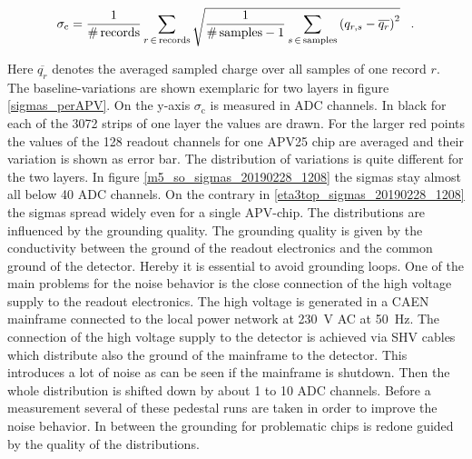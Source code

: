 \documentclass[
twoside,            %
BCOR1.4cm,          %
10pt,               %
headings=normal,    %
headsepline,        %
clearplainpage,		%
final,              %
div=14,
open=right,
bibliography=toc
]{scrreprt}
\begin{document}
\begin{align}
	\sigma_{\mathrm{c}} = 
							\dfrac{1}{\footnotesize\mathrm{\#\,records}} 
							\sum_{r\,\in\,\mathrm{records}} 
							\sqrt{ 
									\dfrac{1}{\mathrm{\footnotesize\#\,samples}-1} 
									\sum_{s\,\in\,\mathrm{samples}}
									\left(
											q_{r,s} - \overline{q_{r}}
									\right)^{2} 
							} \;\;\; .
\end{align}

Here $\overline{q_{r}}$ denotes the averaged sampled charge over all samples of one record $r$.
The baseline-variations are shown exemplaric for two layers in figure \ref{sigmas_perAPV}.
On the y-axis $\sigma_{\mathrm{c}}$ is measured in ADC channels.
In black for each of the 3072 strips of one layer the values are drawn.
For the larger red points the values of the 128 readout channels for one APV25 chip are averaged and their variation is shown as error bar.
The distribution of variations is quite different for the two layers.
In figure \ref{m5_so_sigmas_20190228_1208} the sigmas stay almost all below 40 ADC channels.
On the contrary in \ref{eta3top_sigmas_20190228_1208} the sigmas spread widely even for a single APV-chip.
The distributions are influenced by the grounding quality.
The grounding quality is given by the conductivity between the ground of the readout electronics and the common ground of the detector.
Hereby it is essential to avoid grounding loops. 
One of the main problems for the noise behavior is the close connection of the high voltage supply to the readout electronics.
The high voltage is generated in a CAEN mainframe \cite{caen} connected to the local power network at \SI{230}{V} AC at \SI{50}{Hz}.
The connection of the high voltage supply to the detector is achieved via SHV cables which distribute also the ground of the mainframe to the detector.
This introduces a lot of noise as can be seen if the mainframe is shutdown.
Then the whole distribution is shifted down by about 1 to 10 ADC channels.
Before a measurement several of these pedestal runs are taken in order to improve the noise behavior.
In between the grounding for problematic chips is redone guided by the quality of the distributions.
\end{document}
